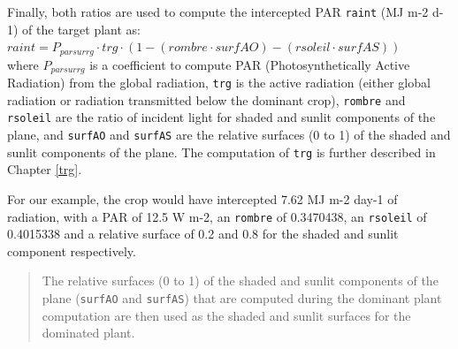 \documentclass[
]{book}
\newenvironment{Shaded}{\begin{snugshade}}{\end{snugshade}}
\newcommand{\DecValTok}[1]{\textcolor[rgb]{0.00,0.00,0.81}{#1}}
\newcommand{\FloatTok}[1]{\textcolor[rgb]{0.00,0.00,0.81}{#1}}
\newcommand{\KeywordTok}[1]{\textcolor[rgb]{0.13,0.29,0.53}{\textbf{#1}}}
\newcommand{\NormalTok}[1]{#1}
\newcommand{\OperatorTok}[1]{\textcolor[rgb]{0.81,0.36,0.00}{\textbf{#1}}}
\newcommand{\StringTok}[1]{\textcolor[rgb]{0.31,0.60,0.02}{#1}}
\begin{document}
Finally, both ratios are used to compute the intercepted PAR \texttt{raint} (MJ m-2 d-1) of the target plant as:\\
\(raint=P_{parsurrg}\cdot trg\cdot(1-(rombre\cdot surfAO)-(rsoleil\cdot surfAS))\)\\
where \(P_{parsurrg}\) is a coefficient to compute PAR (Photosynthetically Active Radiation) from the global radiation, \texttt{trg} is the active radiation (either global radiation or radiation transmitted below the dominant crop), \texttt{rombre} and \texttt{rsoleil} are the ratio of incident light for shaded and sunlit components of the plane, and \texttt{surfAO} and \texttt{surfAS} are the relative surfaces (0 to 1) of the shaded and sunlit components of the plane.
The computation of \texttt{trg} is further described in Chapter \ref{trg}.

\begin{Shaded}
\end{Shaded}

For our example, the crop would have intercepted 7.62 MJ m-2 day-1 of radiation, with a PAR of 12.5 W m-2, an \texttt{rombre} of 0.3470438, an \texttt{rsoleil} of 0.4015338 and a relative surface of 0.2 and 0.8 for the shaded and sunlit component respectively.

\begin{quote}
The relative surfaces (0 to 1) of the shaded and sunlit components of the plane (\texttt{surfAO} and \texttt{surfAS}) that are computed during the dominant plant computation are then used as the shaded and sunlit surfaces for the dominated plant.
\end{quote}
\end{document}
